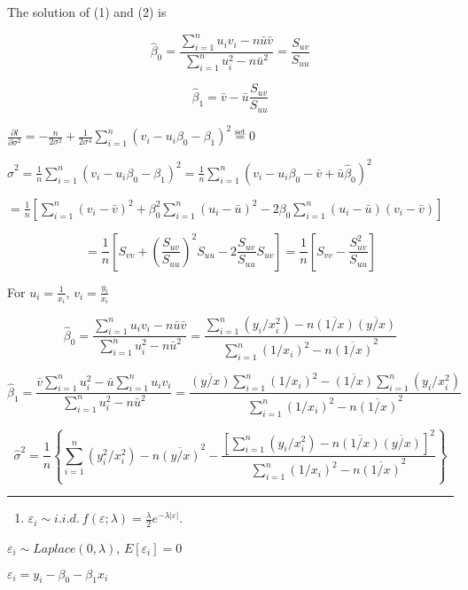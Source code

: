 \documentclass[12pt,]{article}
\providecommand{\tightlist}{%
  \setlength{\itemsep}{0pt}\setlength{\parskip}{0pt}}
\begin{document}
The solution of (1) and (2) is

\[\hat\beta_0=\frac{\sum_{i=1}^{n}u_iv_i-n\bar u\bar v}{\sum_{i=1}^{n}u_i^2-n\bar u^2}=\frac{S_{uv}}{S_{uu}}\]

\[\hat\beta_1=\bar v-\bar u\frac{S_{uv}}{S_{uu}}\]

\(\frac{\partial l}{\partial\sigma^2}=-\frac{n}{2\sigma^2}+\frac{1}{2\sigma^4}\sum_{i=1}^{n}(v_i-u_i\beta_0-\beta_1)^2\overset{\text{set}}{=}0\)

\(\hat\sigma^2=\frac{1}{n}\sum_{i=1}^{n}(v_i-u_i\beta_0-\beta_1)^2=\frac{1}{n}\sum_{i=1}^{n}(v_i-u_i\beta_0-\bar v+\bar u\hat\beta_0)^2\)

\(=\frac{1}{n}\left[\sum_{i=1}^{n}(v_i-\bar v)^2+\beta_0^2\sum_{i=1}^{n}(u_i-\bar u)^2-2\beta_0\sum_{i=1}^{n}(u_i-\bar u)(v_i-\bar v)\right]\)

\[=\frac{1}{n}\left[S_{vv}+(\frac{S_{uv}}{S_{uu}})^2S_{uu}-2\frac{S_{uv}}{S_{uu}}S_{uv}\right]=\frac{1}{n}\left[S_{vv}-\frac{S_{uv}^2}{S_{uu}}\right]\]

For \(u_i=\frac{1}{x_i}\), \(v_i=\frac{y_i}{x_i}\)

\[\hat\beta_0=\frac{\sum_{i=1}^{n}u_iv_i-n\bar u\bar v}{\sum_{i=1}^{n}u_i^2-n\bar u^2}=\frac{\sum_{i=1}^{n}(y_i/x_i^2)-n\overline{(1/x)}\overline{(y/x)}}{\sum_{i=1}^{n}(1/x_i)^2-n\overline{(1/x)}^2}\]

\[\hat\beta_1=\frac{\bar v\sum_{i=1}^{n}u_i^2-\bar u\sum_{i=1}^{n}u_iv_i}{\sum_{i=1}^{n}u_i^2-n\bar u^2}=\frac{\overline{(y/x)}\sum_{i=1}^{n}(1/x_i)^2-\overline{(1/x)}\sum_{i=1}^{n}(y_i/x_i^2)}{\sum_{i=1}^{n}(1/x_i)^2-n\overline{(1/x)}^2}\]

\[\hat\sigma^2=\frac{1}{n}\left\{\sum_{i=1}^{n}(y_i^2/x_i^2)-n\overline{(y/x)}^2-\frac{\left[\sum_{i=1}^{n}(y_i/x_i^2)-n\overline{(1/x)}\overline{(y/x)}\right]^2}{\sum_{i=1}^{n}(1/x_i)^2-n\overline{(1/x)}^2}\right\}\]

\begin{center}\rule{0.5\linewidth}{\linethickness}\end{center}

\begin{enumerate}
\def\labelenumi{\alph{enumi})}
\setcounter{enumi}{1}
\tightlist
\item
  \(\varepsilon_i\sim i.i.d.\ f(\varepsilon;\lambda)=\frac\lambda2e^{-\lambda|\varepsilon|}\).
\end{enumerate}

\(\varepsilon_i\sim Laplace(0,\lambda)\), \(E[\varepsilon_i]=0\)

\(\varepsilon_i=y_i-\beta_0-\beta_1x_i\)
\end{document}

